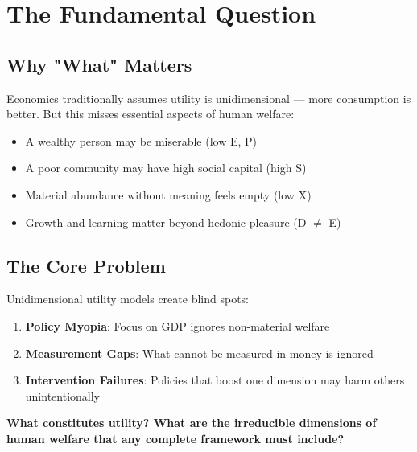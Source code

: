 \section{The Fundamental Question}
\label{sec:what-fundamental}

\subsection{Why "What" Matters}

Economics traditionally assumes utility is unidimensional --- more consumption
is better. But this misses essential aspects of human welfare:

\begin{itemize}
\item A wealthy person may be miserable (low E, P)
\item A poor community may have high social capital (high S)
\item Material abundance without meaning feels empty (low X)
\item Growth and learning matter beyond hedonic pleasure (D $\neq$ E)
\end{itemize}

\subsection{The Core Problem}

Unidimensional utility models create blind spots:

\begin{enumerate}
\item \textbf{Policy Myopia}: Focus on GDP ignores non-material welfare
\item \textbf{Measurement Gaps}: What cannot be measured in money is ignored
\item \textbf{Intervention Failures}: Policies that boost one dimension may
      harm others unintentionally
\end{enumerate}

\begin{tcolorbox}[colback=red!5!white, colframe=red!75!black,
    title=The Fundamental Question]
\textbf{What constitutes utility? What are the irreducible dimensions of human welfare that any complete framework must include?}
\end{tcolorbox}


